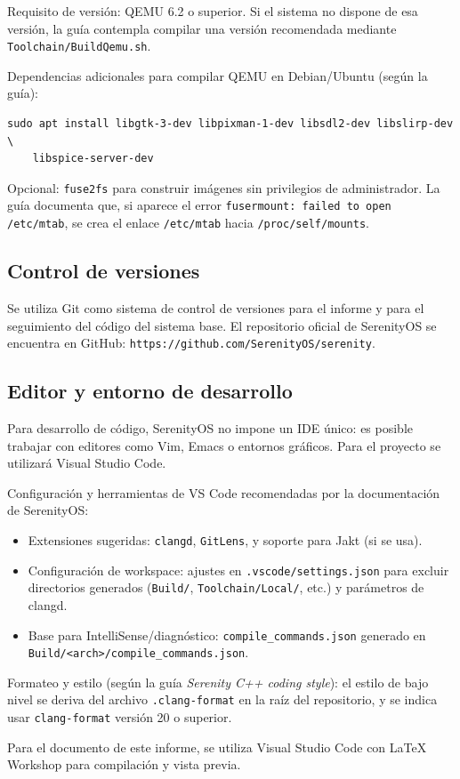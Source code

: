 Requisito de versión: QEMU 6.2 o superior. Si el sistema no dispone de esa versión, la guía contempla compilar una versión recomendada mediante \texttt{Toolchain/BuildQemu.sh}.

Dependencias adicionales para compilar QEMU en Debian/Ubuntu (según la guía):
\begin{verbatim}
sudo apt install libgtk-3-dev libpixman-1-dev libsdl2-dev libslirp-dev \
	libspice-server-dev
\end{verbatim}

Opcional: \texttt{fuse2fs} para construir imágenes sin privilegios de administrador. La guía documenta que, si aparece el error \texttt{fusermount: failed to open /etc/mtab}, se crea el enlace \texttt{/etc/mtab} hacia \texttt{/proc/self/mounts}.

\subsection{Control de versiones}
Se utiliza Git como sistema de control de versiones para el informe y para el seguimiento del código del sistema base. El repositorio oficial de SerenityOS se encuentra en GitHub: \texttt{https://github.com/SerenityOS/serenity}.

\subsection{Editor y entorno de desarrollo}
Para desarrollo de código, SerenityOS no impone un IDE único: es posible trabajar con editores como Vim, Emacs o entornos gráficos. Para el proyecto se utilizará Visual Studio Code.

Configuración y herramientas de VS Code recomendadas por la documentación de SerenityOS:
\begin{itemize}
		\item Extensiones sugeridas: \texttt{clangd}, \texttt{GitLens}, y soporte para Jakt (si se usa).
		\item Configuración de workspace: ajustes en \texttt{.vscode/settings.json} para excluir directorios generados (\texttt{Build/}, \texttt{Toolchain/Local/}, etc.) y parámetros de clangd.
		\item Base para IntelliSense/diagnóstico: \texttt{compile\_commands.json} generado en \texttt{Build/<arch>/compile\_commands.json}.
\end{itemize}

Formateo y estilo (según la guía \textit{Serenity C++ coding style}): el estilo de bajo nivel se deriva del archivo \texttt{.clang-format} en la raíz del repositorio, y se indica usar \texttt{clang-format} versión 20 o superior.

Para el documento de este informe, se utiliza Visual Studio Code con LaTeX Workshop para compilación y vista previa.